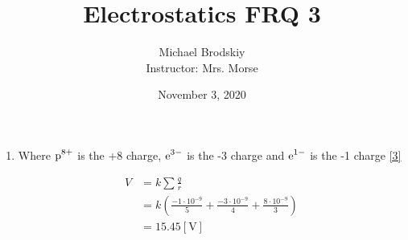 \documentclass[12pt]{article}
\title{Electrostatics FRQ 3}
\date{November 3, 2020}
\author{Michael Brodskiy\\ \small Instructor: Mrs. Morse}
\begin{document}
\maketitle

\begin{enumerate}

  \item Where $\ce{p^8+}$ is the +8 charge, $\ce{e^3-}$ is the -3 charge and $\ce{e^1-}$ is the -1 charge \eqref{3}

    \begin{equation}
      \begin{split}
        V&=k\sum\frac{q}{r}\\
        &=k\left( \frac{-1\cdot10^{-9}}{5}+\frac{-3\cdot10^{-9}}{4}+\frac{8\cdot10^{-9}}{3} \right)\\
        &=15.45[\si{\volt}]
    \end{split}
      \label{3}
    \end{equation}

\end{enumerate}
\end{document}
